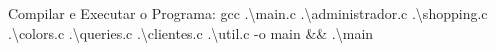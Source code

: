 Compilar e Executar o Programa\+: gcc .\textbackslash{}main.c .\textbackslash{}administrador.c .\textbackslash{}shopping.c .\textbackslash{}colors.c .\textbackslash{}queries.c .\textbackslash{}clientes.c .\textbackslash{}util.c -\/o main \&\& .\textbackslash{}main 